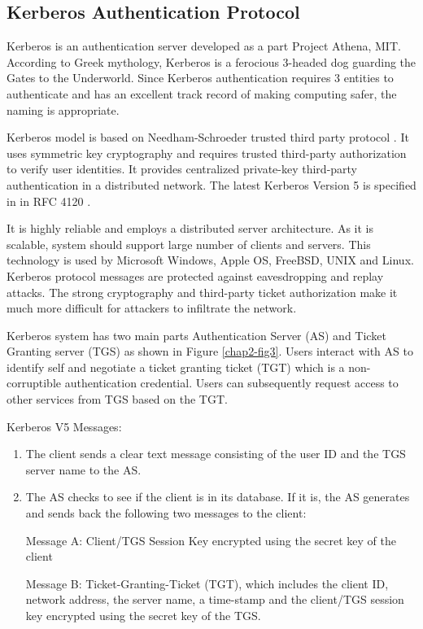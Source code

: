 \begin{multicols}{2}
\section*{Kerberos Authentication Protocol}

Kerberos is an authentication server developed as a part Project Athena, MIT. According to Greek mythology, Kerberos is a ferocious 3-headed dog guarding the Gates to the Underworld. Since Kerberos authentication requires 3 entities to authenticate and has an excellent track record of making computing safer, the naming is appropriate. 

Kerberos model is based on Needham-Schroeder trusted third party protocol \cite{chap2-key1}. It uses symmetric key cryptography and requires trusted third-party authorization to verify user identities. It provides centralized private-key third-party authentication in a distributed network. The latest Kerberos Version 5 is specified in in RFC 4120 \cite{chap2-key12}.

It is highly reliable and employs a distributed server architecture. As it is scalable, system should support large number of clients and servers. This technology is used by Microsoft Windows, Apple OS, FreeBSD, UNIX and Linux. Kerberos protocol messages are protected against eavesdropping and replay attacks. The strong cryptography and third-party ticket authorization make it much more difficult for attackers to infiltrate the network.

Kerberos system has two main parts Authentication Server (AS) and Ticket Granting server (TGS) as shown in Figure \ref{chap2-fig3}. Users interact with AS to identify self and negotiate a ticket granting ticket (TGT) which is a non-corruptible authentication credential. Users can subsequently request access to other services from TGS based on the TGT.

Kerberos V5 Messages:
\begin{enumerate}
\item The client sends a clear text message consisting of the user ID and the TGS server name to the AS.
\item The AS checks to see if the client is in its database. If it is, the AS generates and sends back the following two messages to the client:

Message A: Client/TGS Session Key encrypted using the secret key of the client

Message B: Ticket-Granting-Ticket (TGT), which includes the client ID, network address, the server name, a time-stamp and the client/TGS session key encrypted using the secret key of the TGS.


\end{enumerate}
\end{multicols}
